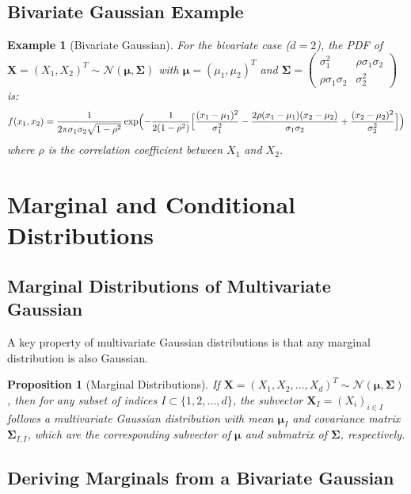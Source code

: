 \documentclass{article}
\newtheorem{proposition}[theorem]{Proposition}
\newtheorem{example}{Example}
\begin{document}
\subsection{Bivariate Gaussian Example}

\begin{example}[Bivariate Gaussian]
For the bivariate case ($d = 2$), the PDF of $\mathbf{X} = (X_1, X_2)^T \sim \mathcal{N}(\boldsymbol{\mu}, \boldsymbol{\Sigma})$ with $\boldsymbol{\mu} = (\mu_1, \mu_2)^T$ and $\boldsymbol{\Sigma} = \begin{pmatrix} \sigma_1^2 & \rho\sigma_1\sigma_2 \\ \rho\sigma_1\sigma_2 & \sigma_2^2 \end{pmatrix}$ is:
\[
f(x_1, x_2) = \frac{1}{2\pi\sigma_1\sigma_2\sqrt{1-\rho^2}} \exp\Bigl(-\frac{1}{2(1-\rho^2)}\Bigl[\frac{(x_1-\mu_1)^2}{\sigma_1^2} - \frac{2\rho(x_1-\mu_1)(x_2-\mu_2)}{\sigma_1\sigma_2} + \frac{(x_2-\mu_2)^2}{\sigma_2^2}\Bigr]\Bigr)
\]
where $\rho$ is the correlation coefficient between $X_1$ and $X_2$.
\end{example}

\section{Marginal and Conditional Distributions}

\subsection{Marginal Distributions of Multivariate Gaussian}

A key property of multivariate Gaussian distributions is that any marginal distribution is also Gaussian. 

\begin{proposition}[Marginal Distributions]
If $\mathbf{X} = (X_1, X_2, \ldots, X_d)^T \sim \mathcal{N}(\boldsymbol{\mu}, \boldsymbol{\Sigma})$, then for any subset of indices $I \subset \{1, 2, \ldots, d\}$, the subvector $\mathbf{X}_I = (X_i)_{i \in I}$ follows a multivariate Gaussian distribution with mean $\boldsymbol{\mu}_I$ and covariance matrix $\boldsymbol{\Sigma}_{I,I}$, which are the corresponding subvector of $\boldsymbol{\mu}$ and submatrix of $\boldsymbol{\Sigma}$, respectively.
\end{proposition}

\subsection{Deriving Marginals from a Bivariate Gaussian}
\end{document}
